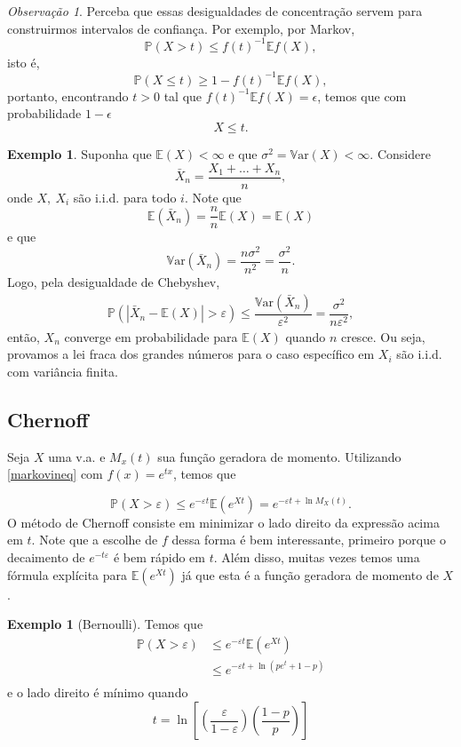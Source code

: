 \documentclass[12pt,a4paper,oneside]{book}
\theoremstyle{definition}
\newtheorem{example}[theorem]{Exemplo}
\theoremstyle{remark}
\newtheorem{remark}[theorem]{Observa\c{c}\~ao}
\numberwithin{equation}{section}
\newcommand{\e}{\varepsilon}
\newcommand{\E}{\mathbb{E}}
\newcommand{\pr}{\mathbb{P}}
\newcommand{\Var}{\mathbb{V}\text{ar}}
\begin{document}
\begin{tcolorbox}[colback = yellow!60]
\begin{remark}
Perceba que essas desigualdades de concentração servem para construirmos intervalos de confiança. Por exemplo, por Markov,
$$\pr(X>t)\leq f(t)^{-1}\E f(X), $$
isto é,
$$\pr(X\leq t)\geq 1- f(t)^{-1}\E f(X), $$
portanto, encontrando $t> 0$ tal que $f(t)^{-1}\E f(X) = \epsilon$, temos que com probabilidade $1-\epsilon$
$$ X\leq t.$$
\end{remark}
\end{tcolorbox}


\begin{tcolorbox}
\begin{example}
Suponha que $\E(X)<\infty$ e que $\sigma^2 = \Var(X)<\infty$. Considere
$$\bar{X}_n = \dfrac{X_1+\dots+X_n}{n}, $$
onde $X,\ X_i$ são i.i.d. para todo $i.$ Note que
$$\E(\bar{X}_n)  = \dfrac{n}{n}\E(X) = \E(X)$$ 
e que
$$\Var(\bar{X}_n)  =  \dfrac{n\sigma^2}{n^2}=  \dfrac{\sigma^2}{n}.$$
Logo, pela desigualdade de Chebyshev, 
\begin{align*}
\pr(|\bar{X}_n - \E(X)|>\e)\leq \dfrac{\Var(\bar{X}_n)}{\e^2} = \dfrac{\sigma^2}{n\e^2},
\end{align*}
então,  $X_n$ converge em probabilidade para $\E(X)$  quando $n$ cresce. Ou seja, provamos a lei fraca dos grandes números para o caso específico em $X_i$ são i.i.d. com variância finita.
\end{example}
\end{tcolorbox}



\subsection{Chernoff}
Seja $X$ uma v.a. e $M_x(t)$ sua função geradora de momento. Utilizando \ref{markovineq} com $f(x) = e^{tx}$, temos que


\begin{equation}\label{markovineq}
\pr(X>\e) \leq  e^{-\e t}\E(e^{Xt}) =  e^{-\e t  + \ln M_X(t)}.
\end{equation}
O método de Chernoff consiste em minimizar o lado direito da expressão acima em $t$. Note que a escolhe de $f$ dessa forma é bem interessante, primeiro porque o decaimento de $e^{-t\e}$ é bem rápido em $t$. Além disso, muitas vezes temos uma fórmula explícita para $\E(e^{Xt})$ já que esta é a função geradora de momento de $X$.

\begin{example}[Bernoulli]
Temos que 
\begin{align*}
\pr(X>\e) & \leq  e^{-\e t}\E(e^{Xt})\\
	& \leq  e^{-\e t + \ln( pe^t + 1-p) }\\
\end{align*} 
e o lado direito é mínimo quando 
$$t = \ln \left[\left( \dfrac{\e}{1-\e}\right)\left(\dfrac{1-p}{p} \right) \right]$$
\end{example}
\end{document}
